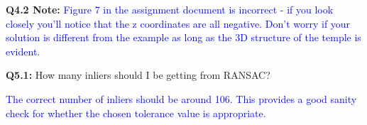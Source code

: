 \documentclass[11pt]{article}
\begin{document}
\noindent \textbf{Q4.2 Note:} \textcolor{blue}{Figure 7 in the assignment document is incorrect - if you look closely you'll notice that the z coordinates are all negative. Don't worry if your solution is different from the example as long as the 3D structure of the temple is evident.}

\noindent \textbf{Q5.1:} How many inliers should I be getting from RANSAC?

\textcolor{blue}{The correct number of inliers should be around 106. This provides a good sanity check for whether the chosen tolerance value is appropriate. }




\end{document}
